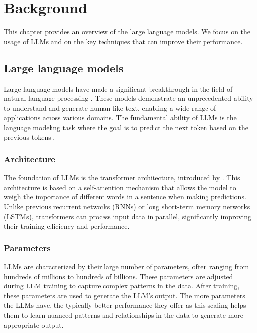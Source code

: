 \chapter{Background}
\label{chap:background}

This chapter provides an overview of the large language models. We focus on the usage of LLMs and on the key techniques that can improve their performance.


\section{Large language models}

Large language models have made a significant breakthrough in the field of natural language processing \cite{Peters2018,Devlin2019,Brown2020}.
These models demonstrate an unprecedented ability to understand and generate human-like text, enabling a wide range of applications across various domains. The fundamental ability of LLMs is the language modeling task where the goal is to predict the next token based on the previous tokens \cite{Bengio2000}.


\subsection{Architecture}

The foundation of LLMs is the transformer architecture, introduced by \citet{Vaswani2017}. This architecture is based on a self-attention mechanism that allows the model to weigh the importance of different words in a sentence when making predictions. Unlike previous recurrent networks (RNNs) or long short-term memory networks (LSTMs), transformers can process input data in parallel, significantly improving their training efficiency and performance.


\subsection{Parameters}

LLMs are characterized by their large number of parameters, often ranging from hundreds of millions to hundreds of billions. These parameters are adjusted during LLM training to capture complex patterns in the data. After training, these parameters are used to generate the LLM's output. The more parameters the LLMs have, the typically better performance they offer \cite{Kaplan2020} as this scaling helps them to learn nuanced patterns and relationships in the data to generate more appropriate output.


